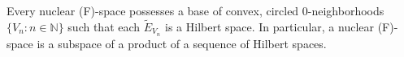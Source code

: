 Every nuclear (F)-space possesses a base of convex, circled $0$-neighborhoods $\{V_n : n \in \mathbb{N}\}$ such that each $\tilde{E}_{V_n}$ is a Hilbert space. In particular, a nuclear (F)-space is a subspace of a product of a sequence of Hilbert spaces.
